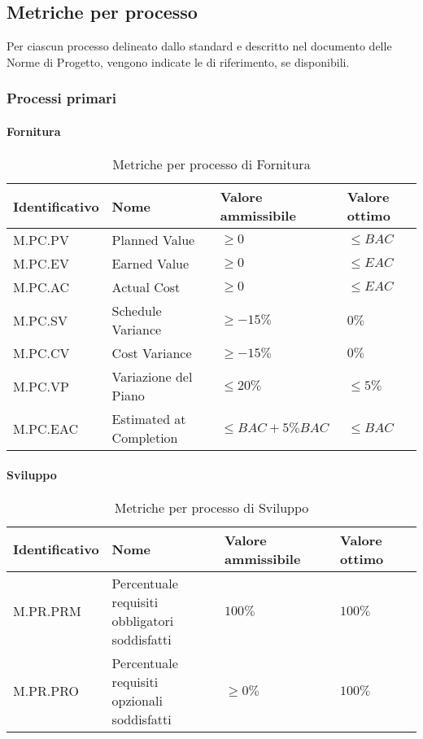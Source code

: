 \subsection{Metriche per processo}
\label{subsec:processi_metriche}
Per ciascun processo delineato dallo standard  e descritto nel documento delle Norme di Progetto, 
vengono indicate le  di riferimento, se disponibili.

\subsubsection{Processi primari}
\paragraph{Fornitura}
\begin{table}[H]
    \centering
    \begin{tabular}{| l | l | l | l |}
    \hline
    \textbf{Identificativo} & 
    \textbf{Nome} &
    \textbf{Valore ammissibile} &
    \textbf{Valore ottimo}\\
    \hline
        M.PC.PV & Planned Value & $\geq 0$ & $\leq BAC$ \\
    \hline
        M.PC.EV & Earned Value & $\geq 0$ & $\leq EAC$ \\
    \hline
        M.PC.AC & Actual Cost & $\geq 0$ & $\leq EAC$ \\
    \hline
        M.PC.SV & Schedule Variance & $\geq -15\%$ & $0\%$ \\
    \hline
        M.PC.CV & Cost Variance & $\geq -15\%$ & $0\%$ \\
    \hline  
        M.PC.VP & Variazione del Piano & $\leq 20\%$ & $\leq 5\%$ \\
    \hline
        M.PC.EAC & Estimated at Completion & $\leq BAC+5\% BAC$ & $\leq BAC$ \\
    \hline
\end{tabular}
\caption{Metriche per processo di Fornitura}
\label{tab:metriche_fornitura} 
\end{table}

\paragraph{Sviluppo}
\begin{table}[H]
    \centering
    \begin{tabular}{| l | l | l | l |}
    \hline
    \textbf{Identificativo} & 
    \textbf{Nome} &
    \textbf{Valore ammissibile} &
    \textbf{Valore ottimo}\\
    \hline
        M.PR.PRM & \makecell{Percentuale requisiti \\ obbligatori soddisfatti} & $100\%$ & $100\%$ \\
    \hline
        M.PR.PRO & \makecell{Percentuale requisiti \\ opzionali soddisfatti} & $\geq 0\%$ & $100\%$ \\
    \hline    
\end{tabular}
\caption{Metriche per processo di Sviluppo}
\label{tab:metriche_sviluppo} 
\end{table}

